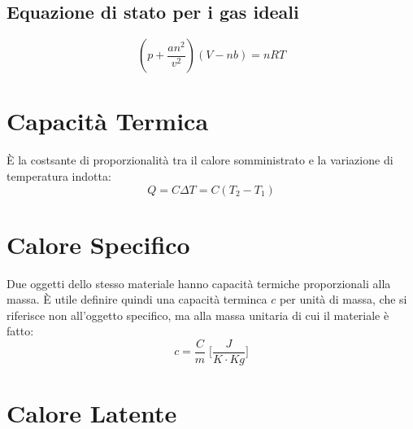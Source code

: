         \subsection{Equazione di stato per i gas ideali}
            \begin{equation}
                (p + \frac{an^2}{v^2})(V - nb) = nRT
            \end{equation}

    \section{Capacità Termica} È la costsante di proporzionalità tra il calore
    somministrato e la variazione di temperatura indotta:
            \begin{equation}
                Q = C \Delta T = C (T_2 - T_1)
            \end{equation}
    
    \section{Calore Specifico} Due oggetti dello stesso materiale hanno 
    capacità termiche proporzionali alla massa. È utile definire quindi una 
    capacità terminca $c$ per unità di massa, che si riferisce non all'oggetto
    specifico, ma alla massa unitaria di cui il materiale è fatto:
            \begin{equation}
                c = \frac{C}{m} \; \Bigg[\frac{J}{K \cdot Kg}\Bigg]
            \end{equation}

    \section{Calore Latente}
